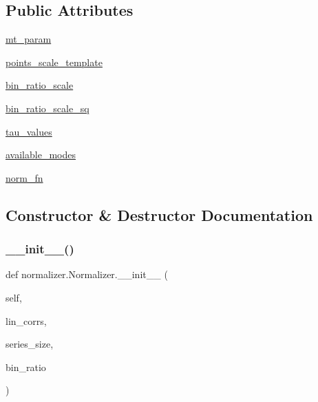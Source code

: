 \subsection*{Public Attributes}
\begin{DoxyCompactItemize}
\item 
\hyperlink{classnormalizer_1_1Normalizer_a63904e0449ec33d948edb1e00eda6bec}{mt\+\_\+param}
\item 
\hyperlink{classnormalizer_1_1Normalizer_adbbbab69e55b4a0593122aa61e7853bc}{points\+\_\+scale\+\_\+template}
\item 
\hyperlink{classnormalizer_1_1Normalizer_a0d063c22fb9e3ee66192bbeb570c2c3e}{bin\+\_\+ratio\+\_\+scale}
\item 
\hyperlink{classnormalizer_1_1Normalizer_a0db45b11e7934a2ce3cdbabc54467164}{bin\+\_\+ratio\+\_\+scale\+\_\+sq}
\item 
\hyperlink{classnormalizer_1_1Normalizer_ae6fdb25c519b72b0f95cc4b2ce150f45}{tau\+\_\+values}
\item 
\hyperlink{classnormalizer_1_1Normalizer_a0fe7ba5c6b5ba3df8578d7edf8bd3ade}{available\+\_\+modes}
\item 
\hyperlink{classnormalizer_1_1Normalizer_a36df68fe4c6f2dbe72f08a71ad1c5fe1}{norm\+\_\+fn}
\end{DoxyCompactItemize}


\subsection{Constructor \& Destructor Documentation}
\mbox{\label{classnormalizer_1_1Normalizer_afccec17549a3a8de54c39b7b5de3d4b7}} 
\subsubsection{\texorpdfstring{\+\_\+\+\_\+init\+\_\+\+\_\+()}{\_\_init\_\_()}}
{\footnotesize\ttfamily def normalizer.\+Normalizer.\+\_\+\+\_\+init\+\_\+\+\_\+ (\begin{DoxyParamCaption}\item[{}]{self,  }\item[{}]{lin\+\_\+corrs,  }\item[{}]{series\+\_\+size,  }\item[{}]{bin\+\_\+ratio }\end{DoxyParamCaption})}

